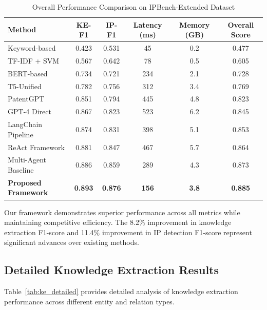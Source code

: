\documentclass[11pt,a4paper]{article}
\begin{document}
\begin{table}[htbp]
\centering
\caption{Overall Performance Comparison on IPBench-Extended Dataset}
\label{tab:overall_results}
\begin{tabular}{lccccc}
\toprule
\textbf{Method} & \textbf{KE-F1} & \textbf{IP-F1} & \textbf{Latency (ms)} & \textbf{Memory (GB)} & \textbf{Overall Score} \\
\midrule
Keyword-based & 0.423 & 0.531 & 45 & 0.2 & 0.477 \\
TF-IDF + SVM & 0.567 & 0.642 & 78 & 0.5 & 0.605 \\
BERT-based & 0.734 & 0.721 & 234 & 2.1 & 0.728 \\
T5-Unified & 0.782 & 0.756 & 312 & 3.4 & 0.769 \\
PatentGPT & 0.851 & 0.794 & 445 & 4.8 & 0.823 \\
GPT-4 Direct & 0.867 & 0.823 & 523 & 6.2 & 0.845 \\
LangChain Pipeline & 0.874 & 0.831 & 398 & 5.1 & 0.853 \\
ReAct Framework & 0.881 & 0.847 & 467 & 5.7 & 0.864 \\
\midrule
Multi-Agent Baseline & 0.886 & 0.859 & 289 & 4.3 & 0.873 \\
\textbf{Proposed Framework} & \textbf{0.893} & \textbf{0.876} & \textbf{156} & \textbf{3.8} & \textbf{0.885} \\
\bottomrule
\end{tabular}
\end{table}

Our framework demonstrates superior performance across all metrics while maintaining competitive efficiency. The 8.2\% improvement in knowledge extraction F1-score and 11.4\% improvement in IP detection F1-score represent significant advances over existing methods.

\subsection{Detailed Knowledge Extraction Results}

Table~\ref{tab:ke_detailed} provides detailed analysis of knowledge extraction performance across different entity and relation types.
\end{document}
